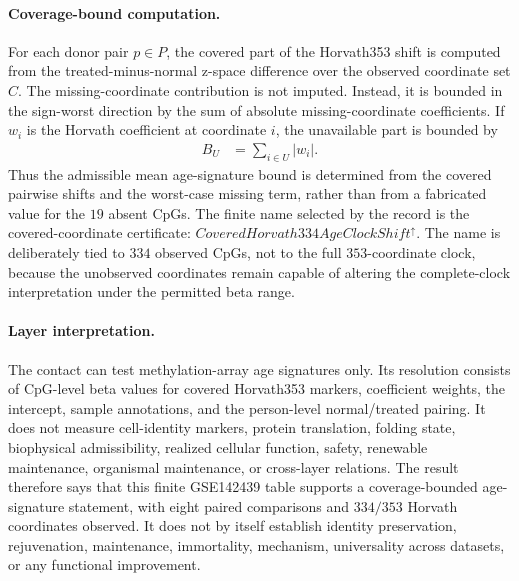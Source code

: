 \paragraph{Coverage-bound computation.}
For each donor pair $p \in P$, the covered part of the Horvath353 shift is computed from the treated-minus-normal z-space difference over the observed coordinate set $C$.  The missing-coordinate contribution is not imputed.  Instead, it is bounded in the sign-worst direction by the sum of absolute missing-coordinate coefficients.  If $w_i$ is the Horvath coefficient at coordinate $i$, the unavailable part is bounded by
$$
\begin{aligned}
B_U &= \sum_{i\in U} |w_i|.
\end{aligned}
$$
Thus the admissible mean age-signature bound is determined from the covered pairwise shifts and the worst-case missing term, rather than from a fabricated value for the $19$ absent CpGs.  The finite name selected by the record is the covered-coordinate certificate: $CoveredHorvath334AgeClockShift^{\uparrow}$.  The name is deliberately tied to $334$ observed CpGs, not to the full $353$-coordinate clock, because the unobserved coordinates remain capable of altering the complete-clock interpretation under the permitted beta range.

\paragraph{Layer interpretation.}
The contact can test methylation-array age signatures only.  Its resolution consists of CpG-level beta values for covered Horvath353 markers, coefficient weights, the intercept, sample annotations, and the person-level normal/treated pairing.  It does not measure cell-identity markers, protein translation, folding state, biophysical admissibility, realized cellular function, safety, renewable maintenance, organismal maintenance, or cross-layer relations.  The result therefore says that this finite GSE142439 table supports a coverage-bounded age-signature statement, with eight paired comparisons and $334/353$ Horvath coordinates observed.  It does not by itself establish identity preservation, rejuvenation, maintenance, immortality, mechanism, universality across datasets, or any functional improvement.


